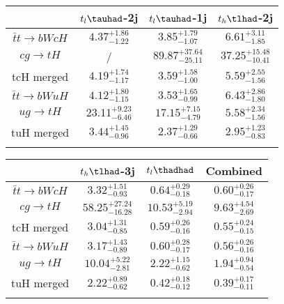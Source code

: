 \centering
\begin{tabular}{cccc} \toprule\toprule
 & $t_l\tauhad$-2j & $t_l\tauhad$-1j & $t_h\tlhad$-2j\\\midrule
$\bar{t}t\to bWcH$ & $4.37^{+1.86}_{-1.22}$ & $3.85^{+1.79}_{-1.07}$ & $6.61^{+3.11}_{-1.85}$\\
$cg\to tH$ &  / & $89.87^{+37.64}_{-25.11}$ & $37.25^{+15.48}_{-10.41}$\\
tcH merged & $4.19^{+1.74}_{-1.17}$ & $3.59^{+1.58}_{-1.00}$ & $5.59^{+2.55}_{-1.56}$\\
$\bar{t}t\to bWuH$ & $4.12^{+1.80}_{-1.15}$ & $3.53^{+1.65}_{-0.99}$ & $6.43^{+2.86}_{-1.80}$\\
$ug\to tH$ & $23.11^{+9.23}_{-6.46}$ & $17.15^{+7.15}_{-4.79}$ & $5.58^{+2.34}_{-1.56}$\\
tuH merged & $3.44^{+1.45}_{-0.96}$ & $2.37^{+1.29}_{-0.66}$ & $2.95^{+1.23}_{-0.83}$\\
\bottomrule\bottomrule\\
\end{tabular}
\begin{tabular}{cccc} \toprule\toprule
 & $t_h\tlhad$-3j & $t_l\thadhad$ & Combined\\\midrule
$\bar{t}t\to bWcH$ & $3.32^{+1.51}_{-0.93}$ & $0.64^{+0.29}_{-0.18}$ & $0.60^{+0.26}_{-0.17}$\\
$cg\to tH$ & $58.25^{+27.24}_{-16.28}$ & $10.53^{+5.19}_{-2.94}$ & $9.63^{+4.54}_{-2.69}$\\
tcH merged & $3.04^{+1.31}_{-0.85}$ & $0.59^{+0.26}_{-0.16}$ & $0.55^{+0.24}_{-0.15}$\\
$\bar{t}t\to bWuH$ & $3.17^{+1.43}_{-0.89}$ & $0.60^{+0.28}_{-0.17}$ & $0.56^{+0.26}_{-0.16}$\\
$ug\to tH$ & $10.04^{+5.22}_{-2.81}$ & $2.22^{+1.15}_{-0.62}$ & $1.94^{+0.94}_{-0.54}$\\
tuH merged & $2.22^{+0.89}_{-0.62}$ & $0.42^{+0.18}_{-0.12}$ & $0.39^{+0.17}_{-0.11}$\\
\bottomrule\bottomrule\\
\end{tabular}
